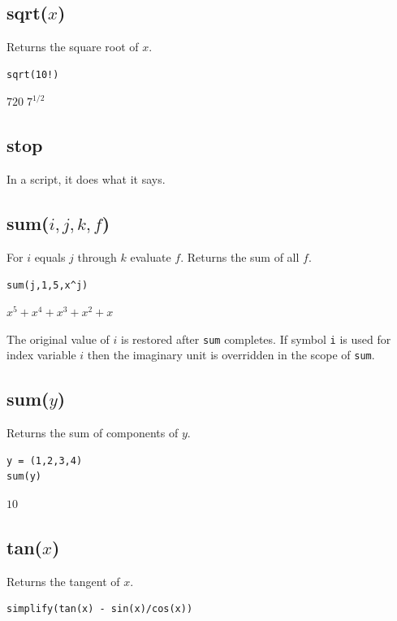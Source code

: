 \documentclass[12pt]{article}
\begin{document}
\subsection*{sqrt($x$)}

Returns the square root of $x$.

{\color{blue}
\begin{verbatim}
sqrt(10!)
\end{verbatim}
}

$\displaystyle 720\; 7^{1/2}$

\subsection*{stop}

In a script, it does what it says.

\subsection*{sum($i,j,k,f$)}

For $i$ equals $j$ through $k$ evaluate $f$.
Returns the sum of all $f$.

{\color{blue}
\begin{verbatim}
sum(j,1,5,x^j)
\end{verbatim}
}

$\displaystyle x^5+x^4+x^3+x^2+x$

\bigskip
The original value of $i$ is restored after {\tt sum} completes.
If symbol {\tt i} is used for index variable $i$
then the imaginary unit is overridden in the scope of {\tt sum}.

\subsection*{sum($y$)}

Returns the sum of components of $y$.

{\color{blue}
\begin{verbatim}
y = (1,2,3,4)
sum(y)
\end{verbatim}
}

$10$

\subsection*{tan($x$)}

Returns the tangent of $x$.

{\color{blue}
\begin{verbatim}
simplify(tan(x) - sin(x)/cos(x))
\end{verbatim}
}
\end{document}
